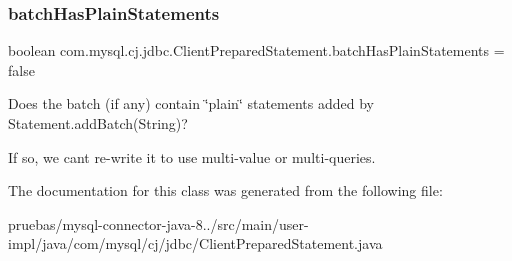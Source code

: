 \subsubsection{\texorpdfstring{batch\+Has\+Plain\+Statements}{batchHasPlainStatements}}
{\footnotesize\ttfamily boolean com.\+mysql.\+cj.\+jdbc.\+Client\+Prepared\+Statement.\+batch\+Has\+Plain\+Statements = false\hspace{0.3cm}{\ttfamily [protected]}}

Does the batch (if any) contain \char`\"{}plain\char`\"{} statements added by Statement.\+add\+Batch(\+String)?

If so, we can\textquotesingle{}t re-\/write it to use multi-\/value or multi-\/queries. 

The documentation for this class was generated from the following file\+:\begin{DoxyCompactItemize}
\item 
pruebas/mysql-\/connector-\/java-\/8../src/main/user-\/impl/java/com/mysql/cj/jdbc/Client\+Prepared\+Statement.\+java\end{DoxyCompactItemize}

